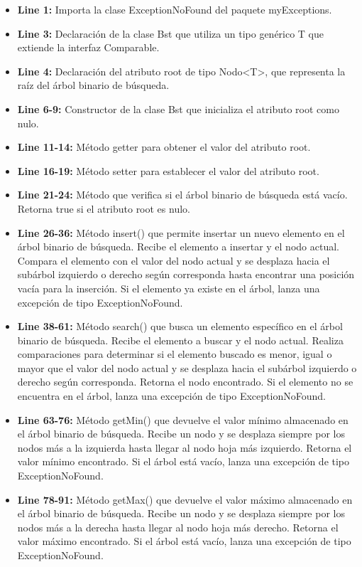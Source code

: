 \documentclass{article}
\begin{document}
		

	\begin{itemize}
		\item \textbf{Line 1:} Importa la clase ExceptionNoFound del paquete myExceptions.
		\item \textbf{Line 3:} Declaración de la clase Bst que utiliza un tipo genérico T que extiende la interfaz Comparable.
		\item \textbf{Line 4:} Declaración del atributo root de tipo Nodo<T>, que representa la raíz del árbol binario de búsqueda.
		\item \textbf{Line 6-9:} Constructor de la clase Bst que inicializa el atributo root como nulo.
		\item \textbf{Line 11-14:} Método getter para obtener el valor del atributo root.
		\item \textbf{Line 16-19:} Método setter para establecer el valor del atributo root.
		\item \textbf{Line 21-24:} Método que verifica si el árbol binario de búsqueda está vacío. Retorna true si el atributo root es nulo.
		\item \textbf{Line 26-36:} Método insert() que permite insertar un nuevo elemento en el árbol binario de búsqueda. Recibe el elemento a insertar y el nodo actual. Compara el elemento con el valor del nodo actual y se desplaza hacia el subárbol izquierdo o derecho según corresponda hasta encontrar una posición vacía para la inserción. Si el elemento ya existe en el árbol, lanza una excepción de tipo ExceptionNoFound.
		\item \textbf{Line 38-61:} Método search() que busca un elemento específico en el árbol binario de búsqueda. Recibe el elemento a buscar y el nodo actual. Realiza comparaciones para determinar si el elemento buscado es menor, igual o mayor que el valor del nodo actual y se desplaza hacia el subárbol izquierdo o derecho según corresponda. Retorna el nodo encontrado. Si el elemento no se encuentra en el árbol, lanza una excepción de tipo ExceptionNoFound.
		\item \textbf{Line 63-76:} Método getMin() que devuelve el valor mínimo almacenado en el árbol binario de búsqueda. Recibe un nodo y se desplaza siempre por los nodos más a la izquierda hasta llegar al nodo hoja más izquierdo. Retorna el valor mínimo encontrado. Si el árbol está vacío, lanza una excepción de tipo ExceptionNoFound.
		\item \textbf{Line 78-91:} Método getMax() que devuelve el valor máximo almacenado en el árbol binario de búsqueda. Recibe un nodo y se desplaza siempre por los nodos más a la derecha hasta llegar al nodo hoja más derecho. Retorna el valor máximo encontrado. Si el árbol está vacío, lanza una excepción de tipo ExceptionNoFound.

\end{itemize}
\end{document}
